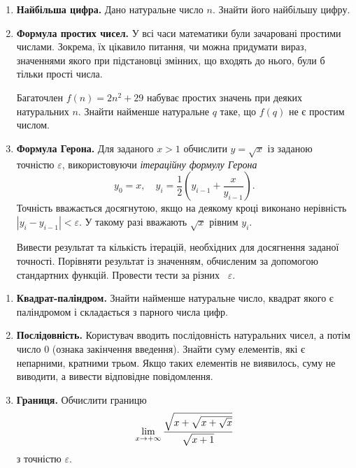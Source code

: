 
\begin{enumerate}
\item \textbf{Найбільша цифра.} Дано натуральне число $n$. Знайти його найбільшу цифру.

\item \textbf{Формула простих чисел.} У всі часи математики були зачаровані простими числами. Зокрема, їх цікавило питання, чи можна придумати вираз, значеннями якого при підстановці змінних, що входять до нього, були б тільки прості числа.

Багаточлен $f(n)=2n^2+29$ набуває простих значень при деяких натуральних $n$. Знайти найменше натуральне $q$ таке, що $f(q)$ не є простим числом.
\item \textbf{Формула Герона.} Для заданого $x>1$ обчислити $y=\sqrt{x}$ із заданою точністю $\varepsilon$, використовуючи {\itshape ітераційну формулу Герона}
$$
y_0 = x,\quad y_i = \frac{1}{2}\left(y_{i-1}+\frac{x}{y_{i-1}}\right).
$$
Точність вважається досягнутою, якщо на деякому кроці виконано нерівність $\left|y_{i}-y_{i-1}\right|<\varepsilon$. У такому разі вважають $\sqrt{x}$ рівним $y_i$.

Вивести результат та кількість ітерацій, необхідних для досягнення заданої точності. Порівняти результат із значенням, обчисленим за допомогою стандартних функцій. Провести тести за різних ~$\varepsilon$.\end{enumerate}





\begin{enumerate}
\item \textbf{Квадрат-паліндром.} Знайти найменше натуральне число, квадрат якого є паліндромом і складається з парного числа цифр.
\item \textbf{Послідовність.} Користувач вводить послідовність натуральних чисел, а потім число 0 (ознака закінчення введення). Знайти суму елементів, які є непарними, кратними трьом. Якщо таких елементів не виявилось, суму не виводити, а вивести відповідне повідомлення.
\item \textbf{Границя.} Обчислити границю
$$
\lim_{x\to+\infty} \frac{\sqrt{x+\sqrt{x+\sqrt{x}}}}{\sqrt{\mathstrut x+1}}
$$
з точністю $\varepsilon$.
\end{enumerate}





